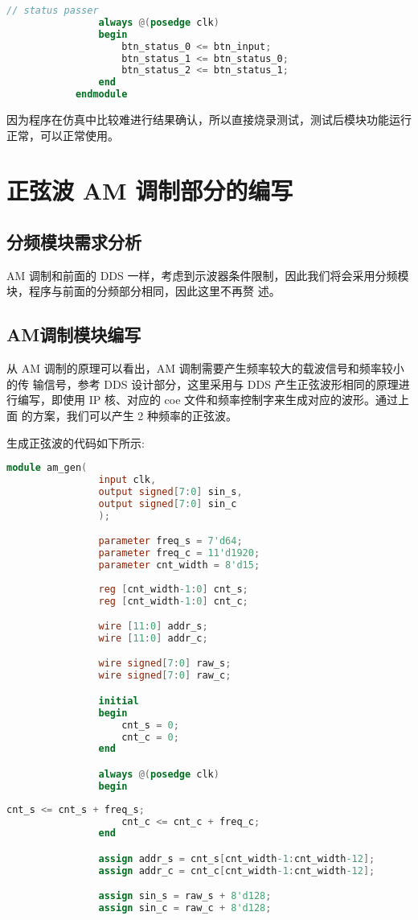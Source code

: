 {\begin{spacing}{1.5}
\begin{lstlisting}[language=Verilog]
				// status passer
				always @(posedge clk)
				begin
					btn_status_0 <= btn_input;
					btn_status_1 <= btn_status_0;
					btn_status_2 <= btn_status_1;
				end
			endmodule
			\end{lstlisting}

			因为程序在仿真中比较难进行结果确认，所以直接烧录测试，测试后模块功能运行正常，可以正常使用。
	\section{正弦波 AM 调制部分的编写}
		\subsection{分频模块需求分析}
			AM 调制和前面的 DDS 一样，考虑到示波器条件限制，因此我们将会采用分频模块，程序与前面的分频部分相同，因此这里不再赘 述。
		\subsection{AM调制模块编写}
			从 AM 调制的原理可以看出，AM 调制需要产生频率较大的载波信号和频率较小的传 输信号，参考 DDS 设计部分，这里采用与 DDS 产生正弦波形相同的原理进行编写，即使用 IP 核、对应的 coe 文件和频率控制字来生成对应的波形。通过上面
			的方案，我们可以产生 2 种频率的正弦波。

			生成正弦波的代码如下所示:
			\begin{lstlisting}[language=Verilog]
			module am_gen(
				input clk,
				output signed[7:0] sin_s,
				output signed[7:0] sin_c
				);

				parameter freq_s = 7'd64;
				parameter freq_c = 11'd1920;
				parameter cnt_width = 8'd15;
				
				reg [cnt_width-1:0] cnt_s;
				reg [cnt_width-1:0] cnt_c;

				wire [11:0] addr_s;
				wire [11:0] addr_c;

				wire signed[7:0] raw_s;
				wire signed[7:0] raw_c;

				initial
				begin
					cnt_s = 0;
					cnt_c = 0;
				end

				always @(posedge clk) 
				begin
			\end{lstlisting}
			\begin{lstlisting}[language=Verilog]
					cnt_s <= cnt_s + freq_s;
					cnt_c <= cnt_c + freq_c; 
				end

				assign addr_s = cnt_s[cnt_width-1:cnt_width-12]; 
				assign addr_c = cnt_c[cnt_width-1:cnt_width-12]; 

				assign sin_s = raw_s + 8'd128;
				assign sin_c = raw_c + 8'd128;


\end{lstlisting}
\end{spacing}}
